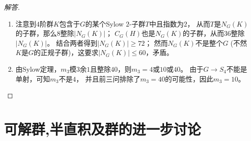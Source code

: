 \begin{enumerate}
\begin{proof}[解答]
\begin{enumerate}[label=(\arabic*)]
    这表明$C_G(H)/H$是$12$阶群，并且$P/H,Q/H$都是其Sylow $3$-子群，
    用第10题可知$C_G(H)/H \cong A_4$。假定$C_G(H)$的Sylow $2$-子群不正规，即$s_2>1$，
    商掉$H$后$A_4$就有不止$1$个Sylow $2$-子群，这当然是不可能的，
    因此$C_G(H)$有正规的Sylow $2$-子群$K$。
    \item 注意到$4$阶群$K$包含于$G$的某个Sylow $2$-子群$T$中且指数为$2$，
    从而$T$是$N_G(K)$的子群，那么$8$整除$|N_G(K)|$；
    $C_G(H)$也是$N_G(K)$的子群，从而$36$整除$|N_G(K)|$。
    结合两者得到$|N_G(K)|\geqslant72$；
    然而$N_G(K)$不是整个$G$ (不然$K$是$G$的正规子群)，这要求$|N_G(K)|\leqslant60$，矛盾。
    \item 由Sylow定理，$m_3$模$3$余$1$且整除$40$，则$m_3=4$或$10$或$40$。
    由于$G \to S_4$不能是单射，可知$m_3$不是$4$，
    并且前三问排除了$m_3=40$的可能性，因此$m_3=10$。\qedhere
    \end{enumerate}
\end{proof}
\end{enumerate}

\section{可解群,半直积及群的进一步讨论}

